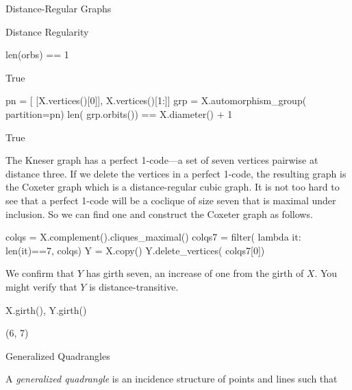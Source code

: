 \begin{chap}{Distance-Regular Graphs}
\begin{sect}{Distance Regularity}
\begin{sagecode}
\begin{sageinput}
len(orbs) == 1 
\end{sageinput}
\begin{sageoutput}
True
\end{sageoutput}
\end{sagecode}
%
\begin{sagecode}
\begin{sageinput}
pn = [ [X.vertices()[0]], X.vertices()[1:]]
grp = X.automorphism_group( partition=pn)
len( grp.orbits()) == X.diameter() + 1
\end{sageinput}
\begin{sageoutput}
True
\end{sageoutput}
\end{sagecode}
%
\begin{para}
The Kneser graph has a perfect 1-code---a set of seven vertices pairwise at distance
three. If we delete the vertices in a perfect 1-code, the resulting graph
is the Coxeter graph which is a distance-regular cubic graph.
It is not too hard to see that a perfect 1-code will be a coclique of size seven
that is maximal under inclusion. So we can find one and construct the
Coxeter graph as follows.
\end{para}
%
\begin{sagecode}
\begin{sageinput}
colqs = X.complement().cliques_maximal()
colqs7 = filter( lambda it: len(it)==7, colqs)
Y = X.copy()
Y.delete_vertices( colqs7[0])
\end{sageinput}
\end{sagecode}
%
\begin{para}
We confirm that $Y$ has girth seven, an increase of one from the girth of $X$.  You might verify that $Y$ is distance-transitive.
\end{para}
%
\begin{sagecode}
\begin{sageinput}
X.girth(), Y.girth()
\end{sageinput}
\begin{sageoutput}
(6, 7)
\end{sageoutput}
\end{sagecode}
%
\end{sect}
%
\begin{sect}{Generalized Quadrangles}
%
\begin{para}
A \textsl{generalized quadrangle} is an incidence structure of points
and lines such that
\end{para}
%
\begin{enumerate}
    \begin{listitem}

\end{listitem}
\end{enumerate}
\end{sect}
\end{chap}
